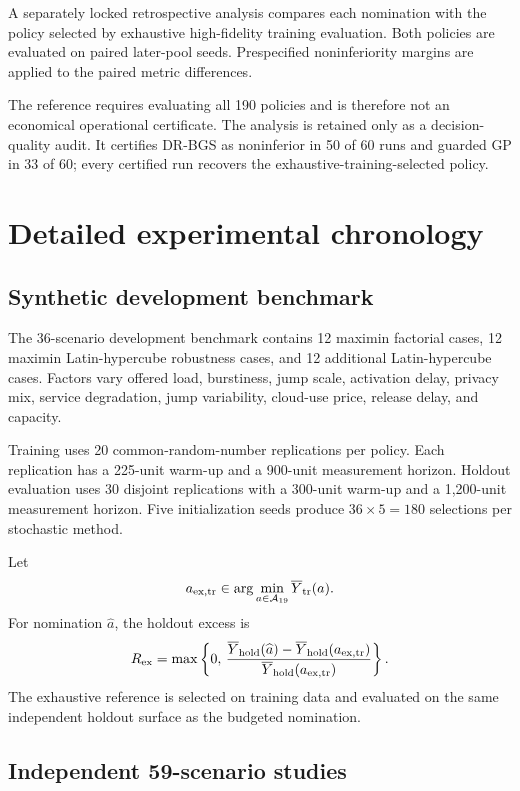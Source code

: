 \documentclass[futureinternet,supfile,submit,moreauthors]{Definitions/mdpi}
\newcommand{\Aset}{\mathcal A}
\begin{document}
A separately locked retrospective analysis compares each nomination with the
policy selected by exhaustive high-fidelity training evaluation. Both policies
are evaluated on paired later-pool seeds. Prespecified noninferiority margins
are applied to the paired metric differences.

The reference requires evaluating all 190 policies and is therefore not an
economical operational certificate. The analysis is retained only as a
decision-quality audit. It certifies DR-BGS as noninferior in 50 of 60 runs
and guarded GP in 33 of 60; every certified run recovers the
exhaustive-training-selected policy.

\section{Detailed experimental chronology}
\label{sec:chronology}

\subsection{Synthetic development benchmark}

The 36-scenario development benchmark contains 12 maximin factorial cases,
12 maximin Latin-hypercube robustness cases, and 12 additional
Latin-hypercube cases. Factors vary offered load, burstiness, jump scale,
activation delay, privacy mix, service degradation, jump variability,
cloud-use price, release delay, and capacity.

Training uses 20 common-random-number replications per policy. Each
replication has a 225-unit warm-up and a 900-unit measurement horizon.
Holdout evaluation uses 30 disjoint replications with a 300-unit warm-up and
a 1,200-unit measurement horizon. Five initialization seeds produce
\(36\times5=180\) selections per stochastic method.

Let
\[
a_{\rm ex,tr}
\in
\arg\min_{a\in\Aset_{19}}
\overline Y_{\rm tr}(a).
\]
For nomination \(\widehat a\), the holdout excess is
\[
R_{\rm ex}
=
\max
\left\{
0,\,
\frac{
\overline Y_{\rm hold}(\widehat a)
-
\overline Y_{\rm hold}(a_{\rm ex,tr})
}{
\overline Y_{\rm hold}(a_{\rm ex,tr})
}
\right\}.
\]
The exhaustive reference is selected on training data and evaluated on the
same independent holdout surface as the budgeted nomination.

\subsection{Independent 59-scenario studies}
\end{document}
